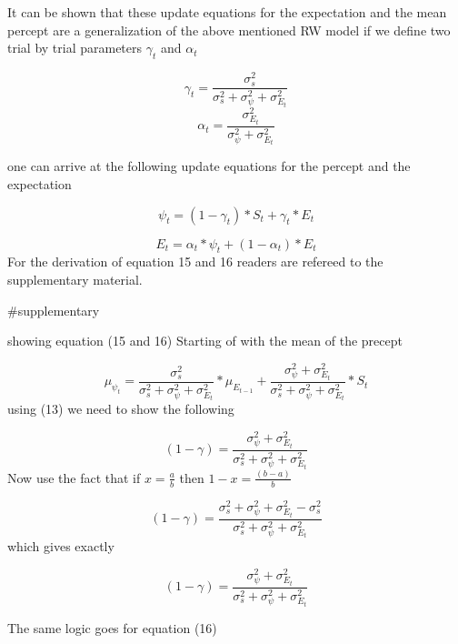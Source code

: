 \documentclass[
]{article}
\begin{document}
It can be shown that these update equations for the expectation and the
mean percept are a generalization of the above mentioned RW model if we
define two trial by trial parameters \(\gamma_{t}\) and \(\alpha_{t}\)

\[
\begin{equation}
\tag{13}
\gamma_{t} = \frac{\sigma_{s}^2}{\sigma_{s}^2+\sigma_{\psi}^2+\sigma_{E_t}^2}
\end{equation}
\] \[
\begin{equation}
\tag{14}
\alpha_{t} = \frac{\sigma_{E_t}^2}{\sigma_{\psi}^2+\sigma_{E_t}^2}
\end{equation}
\]

one can arrive at the following update equations for the percept and the
expectation

\[
\begin{equation}
\tag{15}
\psi_{t} = (1-\gamma_{t})*S_{t}+\gamma_{t}*E_{t}
\end{equation}
\]

\[
\begin{equation}
\tag{16}
E_{t} = \alpha_{t}*\psi_{t}+(1-\alpha_{t})*E_{t}
\end{equation}
\] For the derivation of equation 15 and 16 readers are refereed to the
supplementary material.

\#supplementary

showing equation (15 and 16) Starting of with the mean of the precept

\[
\begin{equation}
\mu_{\psi_t} = \frac{\sigma_{s}^2}{\sigma_{s}^2+\sigma_{\psi}^2+\sigma_{E_t}^2}*\mu_{E_{t-1}}+\frac{\sigma_{\psi}^2+\sigma_{E_t}^2}{\sigma_{s}^2+\sigma_{\psi}^2+\sigma_{E_t}^2}*S_t
\end{equation}
\] using (13) we need to show the following

\[
\begin{equation}
(1-\gamma) = \frac{\sigma_{\psi}^2+\sigma_{E_t}^2}{\sigma_{s}^2+\sigma_{\psi}^2+\sigma_{E_t}^2}
\end{equation}
\] Now use the fact that if \(x = \frac{a}{b}\) then
\(1-x = \frac{(b-a)}{b}\)

\[
\begin{equation}
(1-\gamma) = \frac{\sigma_{s}^2+\sigma_{\psi}^2+\sigma_{E_t}^2-\sigma_{s}^2}{\sigma_{s}^2+\sigma_{\psi}^2+\sigma_{E_t}^2}
\end{equation}
\] which gives exactly

\[
\begin{equation}
(1-\gamma) = \frac{\sigma_{\psi}^2+\sigma_{E_t}^2}{\sigma_{s}^2+\sigma_{\psi}^2+\sigma_{E_t}^2}
\end{equation}
\]

The same logic goes for equation (16)
\end{document}
